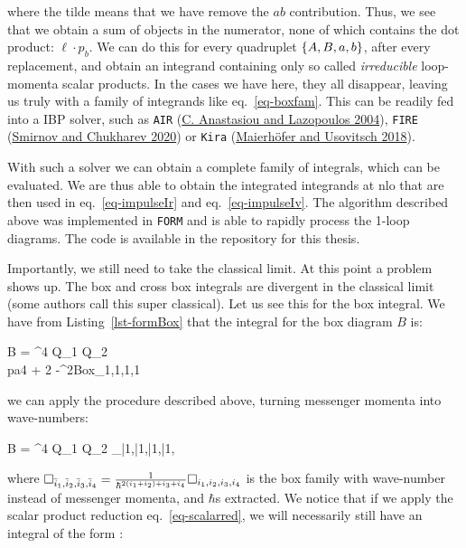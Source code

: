 \documentclass[
  11pt,
  a4paper,
  DIV=11,
  numbers=noendperiod,
  oneside]{scrreprt}
\let\[\relax \let\]\relax %
\DeclareRobustCommand{\[}{\begin{equation}}
\DeclareRobustCommand{\]}{\end{equation}}
\begin{document}
where the tilde means that we have remove the \(ab\) contribution. Thus,
we see that we obtain a sum of objects in the numerator, none of which
contains the dot product: \(\ell\cdot p_b\). We can do this for every
quadruplet \(\{A,B,a,b \}\), after every replacement, and obtain an
integrand containing only so called \emph{irreducible} loop-momenta
scalar products. In the cases we have here, they all disappear, leaving
us truly with a family of integrands like eq.~\ref{eq-boxfam}. This can
be readily fed into a IBP solver, such as \texttt{AIR}
(\protect\hyperlink{ref-Anastasiou:2004}{C. Anastasiou and Lazopoulos
2004}), \texttt{FIRE} (\protect\hyperlink{ref-Smirnov:2020}{Smirnov and
Chukharev 2020}) or \texttt{Kira}
(\protect\hyperlink{ref-Maierhofer:2018}{Maierhöfer and Usovitsch
2018}).

With such a solver we can obtain a complete family of integrals, which
can be evaluated. We are thus able to obtain the integrated integrands
at \gls{nlo} that are then used in eq.~\ref{eq-impulseIr} and
eq.~\ref{eq-impulseIv}. The algorithm described above was implemented in
\texttt{FORM} and is able to rapidly process the 1-loop diagrams. The
code is available in the repository for this thesis.

Importantly, we still need to take the classical limit. At this point a
problem shows up. The box and cross box integrals are divergent in the
classical limit (some authors call this super classical). Let us see
this for the box integral. We have from Listing~\ref{lst-formBox} that
the integral for the box diagram \(B\) is:

\[
\im B = \elch^4 Q_{1} Q_{2} \int \dn[D]{\ell} \\pa{4 \semom[1]\cdot \semom[2]  + 2\ell\cdot\pa{\semom[2] -\semom[1]} -\pa{\tm-\ell}^2}Box_{1,1,1,1}
\]

we can apply the procedure described above, turning messenger momenta
into wave-numbers:

\[
\im B = \elch^4 Q_{1} Q_{2} \int \dn[D]{\bar{\ell}} \Box_{\bar{1},\bar{1},\bar{1},\bar{1}},
\]

where
\(\Box_{\bar{i}_1,\bar{i}_2,\bar{i}_3,\bar{i}_4} =\frac{1}{\hbar^{2(i_1+i_2)+i_3+i_4}} \Box_{i_1,i_2,i_3,i_4}\)
is the box family with wave-number instead of messenger momenta, and
\(\hbar\)s extracted. We notice that if we apply the scalar product
reduction eq.~\ref{eq-scalarred}, we will necessarily still have an
integral of the form :
\end{document}
